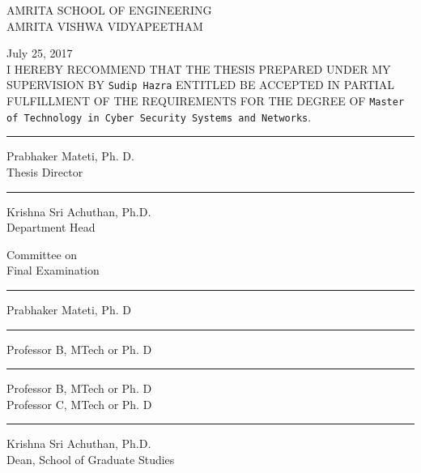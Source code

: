\newpage
\thispagestyle{empty}

\begin{center}
AMRITA SCHOOL OF ENGINEERING \\
AMRITA VISHWA VIDYAPEETHAM\\
\end{center}

\hfill
July 25, 2017\\			%

I HEREBY RECOMMEND THAT THE THESIS PREPARED UNDER MY SUPERVISION BY
{\tt Sudip Hazra}		%
ENTITLED
{\tt \thesisTitle}
BE ACCEPTED IN PARTIAL FULFILLMENT OF THE
REQUIREMENTS FOR THE DEGREE OF
{\tt Master of Technology in Cyber Security Systems and Networks}.\\


\hfill
\begin{minipage}{7cm}
\vskip 1cm\hrule\par\vskip 2mm
Prabhaker Mateti, Ph. D.\\	%
Thesis Director\\
\vskip 1cm\hrule\par\vskip 2mm
Krishna Sri Achuthan, Ph.D.\\
Department Head\\
\end{minipage}

\vfill
\begin{minipage}{7cm}
Committee on\\
Final Examination\\
\vskip 1cm\hrule\par\vskip 2mm
Prabhaker Mateti, Ph. D\\
\vskip 1cm\hrule\par\vskip 2mm
Professor B, MTech or Ph. D\\
\vskip 1cm\hrule\par\vskip 2mm
Professor B, MTech or Ph. D\\
Professor C, MTech or Ph. D\\
\vskip 1cm\hrule\par\vskip 2mm
Krishna Sri Achuthan, Ph.D.\\
Dean, School of Graduate Studies
\end{minipage}
